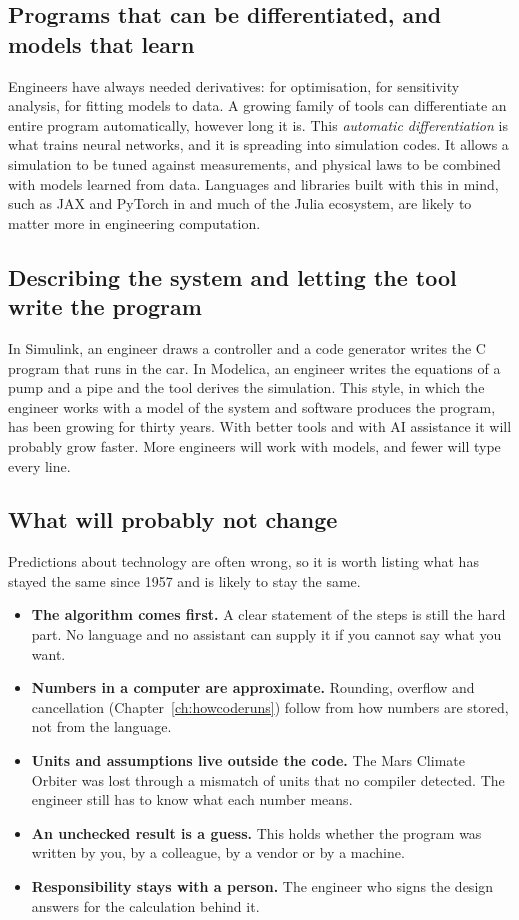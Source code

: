 \subsection*{Programs that can be differentiated, and models that learn}

Engineers have always needed derivatives: for optimisation, for sensitivity analysis, for
fitting models to data. A growing family of tools can differentiate an entire program
automatically, however long it is. This \emph{automatic differentiation} is what trains
neural networks, and it is spreading into simulation codes. It allows a simulation to be
tuned against measurements, and physical laws to be combined with models learned from
data. Languages and libraries built with this in mind, such as JAX and PyTorch in \py and
much of the Julia ecosystem, are likely to matter more in engineering computation.

\subsection*{Describing the system and letting the tool write the program}

In Simulink, an engineer draws a controller and a code generator writes the C program
that runs in the car. In Modelica, an engineer writes the equations of a pump and a pipe
and the tool derives the simulation. This style, in which the engineer works with a model
of the system and software produces the program, has been growing for thirty years. With
better tools and with AI assistance it will probably grow faster. More engineers will
work with models, and fewer will type every line.

\subsection*{What will probably not change}

Predictions about technology are often wrong, so it is worth listing what has stayed the
same since 1957 and is likely to stay the same.

\begin{itemize}
\item \textbf{The algorithm comes first.} A clear statement of the steps is still the
  hard part. No language and no assistant can supply it if you cannot say what you want.
\item \textbf{Numbers in a computer are approximate.} Rounding, overflow and cancellation
  (Chapter~\ref{ch:howcoderuns}) follow from how numbers are stored, not from the language.
\item \textbf{Units and assumptions live outside the code.} The Mars Climate Orbiter was
  lost through a mismatch of units that no compiler detected. The engineer still has to
  know what each number means.
\item \textbf{An unchecked result is a guess.} This holds whether the program was written
  by you, by a colleague, by a vendor or by a machine.
\item \textbf{Responsibility stays with a person.} The engineer who signs the design
  answers for the calculation behind it.
\end{itemize}

